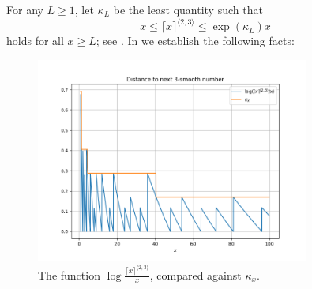 \documentclass[12pt,a4paper,reqno]{amsart}
\numberwithin{equation}{section}
\theoremstyle{plain}
\theoremstyle{definition}
\begin{document}
For any $L \geq 1$, let $\kappa_L$ be the least quantity such that
\begin{equation}\label{kappa-def}  
  x \leq \lceil x \rceil^{\langle 2,3\rangle} \leq \exp(\kappa_L) x 
\end{equation}
holds for all $x \geq L$; see .  In  we establish the following facts:

\begin{figure}
  \centering
  \includegraphics[width=0.8\textwidth]{next_smooth.png}
  \caption{The function $\log \frac{\lceil x \rceil^{\langle 2,3 \rangle}}{x}$, compared against $\kappa_x$. 
  }\label{fig:nextsmooth}
  \end{figure}
\end{document}
